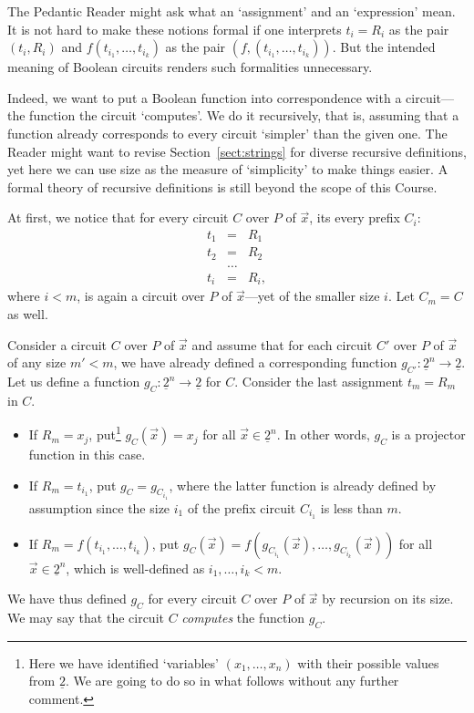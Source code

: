 \documentclass[12pt,notitlepage]{article}
\theoremstyle{plain}
\theoremstyle{definition}
\theoremstyle{plain}
\newcommand{\ul}[1]{\underline{#1}}
\newcommand{\1}{\mathbf{1}}
\newcommand{\0}{\mathbf{0}}
\begin{document}
The Pedantic Reader might ask what an `assignment' and an `expression' mean. It is not hard to make these notions formal if one interprets $t_i  = R_i$ as the pair $(t_i, R_i)$ and $f(t_{i_1},\ldots, t_{i_k})$ as the pair $(f, (t_{i_1},\ldots, t_{i_k}))$. But the intended meaning of Boolean circuits renders such formalities unnecessary.

Indeed, we want to put a Boolean function into correspondence with a circuit---the function the circuit `computes'. We do it recursively, that is, assuming that a function already corresponds to every circuit `simpler' than the given one. The Reader might want to revise Section~\ref{sect:strings} for diverse recursive definitions, yet here we can use size as the measure of `simplicity' to make things easier. A formal theory of recursive definitions is still beyond the scope of this Course.

At first, we notice that for every circuit $C$ over $P$ of $\vec x$, its every prefix $C_i$:
$$
\begin{array}{rcl}
	t_1 &=& R_1\\
	t_2 &=& R_2\\
	&\ldots&\\
	t_i &=& R_i,
\end{array}
$$
where $i < m$, is again a circuit over $P$ of $\vec x$---yet of the smaller size $i$. Let $C_m = C$ as well.

Consider a circuit $C$ over $P$ of $\vec x$ and assume that for each circuit $C'$ over $P$ of $\vec x$ of any size $m' < m$, we have already defined a corresponding function $g_{C'} \colon \ul{2}^n \to \ul{2}$. Let us define a function $g_C \colon \ul{2}^n \to \ul{2}$ for $C$. Consider the last assignment $t_m = R_m$ in $C$.
\begin{itemize}
	\item If $R_m = x_j$, put\footnote{Here we have identified `variables' $(x_1, \ldots, x_n)$ with their possible values from $\ul{2}$. We are going to do so in what follows without any further comment.} $g_C(\vec x) = x_j$ for all $\vec x \in \ul{2}^n$. In other words, $g_C$ is a projector function in this case.
	\item If $R_m = t_{i_1}$, put $g_C = g_{C_{i_1}}$, where the latter function is already defined by assumption since the size $i_1$ of the prefix circuit $C_{i_1}$ is less than $m$.
	\item If $R_m = f(t_{i_1},\ldots, t_{i_k})$, put $g_C(\vec x) = f(g_{C_{i_1}}(\vec x),\ldots, g_{C_{i_k}}(\vec x))$ for all $\vec x \in \ul{2}^n$, which is well-defined as $i_1, \ldots, i_k < m$.
\end{itemize}
We have thus defined $g_C$ for every circuit $C$ over $P$ of $\vec x$ by recursion on its size. We may say that the circuit $C$ \emph{computes} the function $g_C$. 
\end{document}
